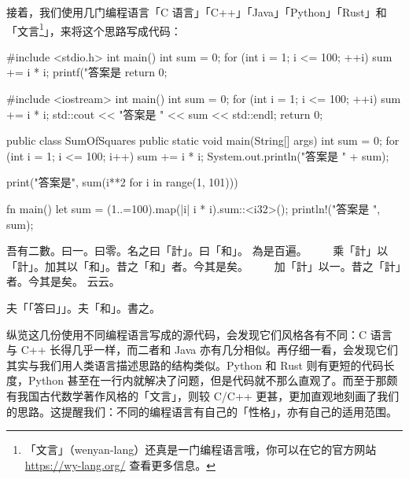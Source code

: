 接着，我们使用几门编程语言「C 语言」「C++」「Java」「Python」「Rust」和「文言\footnote{「文言」（wenyan-lang）还真是一门编程语言哦，你可以在它的官方网站 \url{https://wy-lang.org/} 查看更多信息。}」，来将这个思路写成代码：

\begin{MissingVerbatim}[c]
#include <stdio.h>
int main() {
    int sum = 0;
    for (int i = 1; i <= 100; ++i) {
        sum += i * i;
    }
    printf("答案是 %
    return 0;
}
\end{MissingVerbatim}

\begin{MissingVerbatim}[cpp]
#include <iostream>
int main() {
    int sum = 0;
    for (int i = 1; i <= 100; ++i) {
        sum += i * i;
    }
    std::cout << "答案是 " << sum << std::endl;
    return 0;
}
\end{MissingVerbatim}

\begin{MissingVerbatim}[java]
public class SumOfSquares {
    public static void main(String[] args) {
        int sum = 0;
        for (int i = 1; i <= 100; i++) {
            sum += i * i;
        }
        System.out.println("答案是 " + sum);
    }
}
\end{MissingVerbatim}

\begin{MissingVerbatim}[python]
print("答案是", sum(i**2 for i in range(1, 101)))
\end{MissingVerbatim}

\begin{MissingVerbatim}[rust]
fn main() {
    let sum = (1..=100).map(|i| i * i).sum::<i32>();
    println!("答案是 {}", sum);
}
\end{MissingVerbatim}

\begin{MissingVerbatim}
吾有二數。曰一。曰零。名之曰「計」。曰「和」。
為是百遍。
　　乘「計」以「計」。加其以「和」。昔之「和」者。今其是矣。
　　加「計」以一。昔之「計」者。今其是矣。
云云。

夫「「答曰」」。夫「和」。書之。
\end{MissingVerbatim}

纵览这几份使用不同编程语言写成的源代码，会发现它们风格各有不同：C 语言与 C++ 长得几乎一样，而二者和 Java 亦有几分相似。再仔细一看，会发现它们其实与我们用人类语言描述思路的结构类似。Python 和 Rust 则有更短的代码长度，Python 甚至在一行内就解决了问题，但是代码就不那么直观了。而至于那颇有我国古代数学著作风格的「文言」，则较 C/C++ 更甚，更加直观地刻画了我们的思路。这提醒我们：不同的编程语言有自己的「性格」，亦有自己的适用范围。


